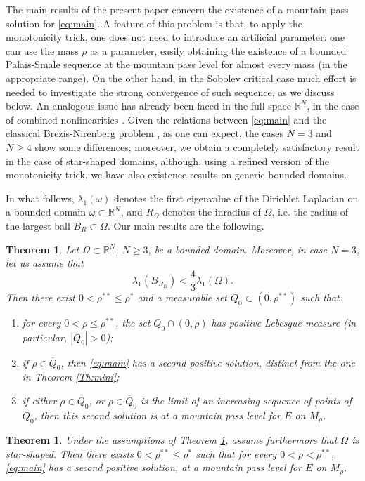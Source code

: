 \documentclass[10pt]{article}
\newcommand{\R}{\mathbb{R}}
\newtheorem{theorem}[proposition]{Theorem}
\theoremstyle{definition}
\numberwithin{equation}{section}
\begin{document}
The main results of the present paper concern the existence of a mountain pass solution 
for \eqref{eq:main}. A feature of this problem is that, to apply the monotonicity trick, 
one does not need to introduce an artificial parameter: one can use the mass $\rho$ as a 
parameter, easily obtaining the existence of a bounded Palais-Smale sequence at the mountain pass 
level for almost every mass (in the appropriate range). On the other hand, in the Sobolev critical 
case much effort is needed to investigate the strong convergence of such sequence, as we discuss below. 
An analogous issue has already been faced in the full space $\R^N$, in the case of combined 
nonlinearities \cite{MR4096725,MR4433054,MR4476243}. Given the relations between \eqref{eq:main} 
and the classical 
Brezis-Nirenberg problem \cite{BrezisNirenberg}, as one can expect, the cases $N=3$ and $N\ge4$ show 
some differences; moreover, we obtain a completely satisfactory result in the case of star-shaped 
domains, although, using a refined version of the monotonicity trick, we have also existence results
on generic bounded domains. 

In what follows, $\lambda_1(\omega)$ denotes the first eigenvalue of the Dirichlet 
Laplacian on a bounded domain $\omega\subset\R^N$, and $R_\Omega$ denotes the inradius of $\Omega$, i.e. the  
radius of the largest ball $B_R\subset\Omega$. Our main results are the following.

\begin{theorem}\label{Th:mp2}
Let $\Omega\subset\R^N$, $N\ge3$, be a bounded domain. Moreover, in case $N=3$, let us 
assume that 
\begin{equation}\label{eq:BRBR}
\lambda_{1}(B_{R_\Omega})<\frac{4}{3}\lambda_{1}(\Omega).
\end{equation}
%
Then there exist $0<\rho^{**}\le \rho^*$ and a measurable set $Q_0\subset(0,\rho^{**})$ such that:
\begin{enumerate}
\item for every $0<\rho\le\rho^{**}$, the set $Q_0\cap \left(0,\rho\right)$ has positive Lebesgue measure
(in particular, $|Q_0|>0$);
\item if $\rho\in \overline{Q}_0$, then \eqref{eq:main} has a second positive solution, distinct 
from the one in Theorem \ref{Th:mini};
\item if either $\rho\in Q_0$, or $\rho\in\overline{Q}_0$ is the limit of an increasing sequence of 
points of $Q_0$, then this second solution is at a mountain pass level for $E$ on $M_{\rho}$.
\end{enumerate}
\end{theorem}
%
\begin{theorem}\label{Th:mp}
Under the assumptions of Theorem \ref{Th:mp2}, assume furthermore that 
$\Omega$ is star-shaped. Then there exists $0<\rho^{**}\le \rho^*$ such that 
for every $0<\rho<\rho^{**}$, \eqref{eq:main} has a second positive solution, at a mountain pass level 
for $E$ on $M_{\rho}$.
\end{theorem}
\end{document}
